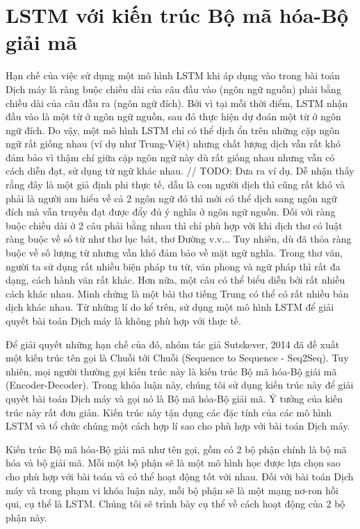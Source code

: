 \section{LSTM với kiến trúc Bộ mã hóa-Bộ giải mã}
Hạn chế của việc sử dụng một mô hình LSTM khi áp dụng vào trong bài toán Dịch máy là ràng buộc chiều dài của câu đầu vào (ngôn ngữ nguồn) phải bằng chiều dài của câu đầu ra (ngôn ngữ đích). Bởi vì tại mỗi thời điểm, LSTM nhận đầu vào là một từ ở ngôn ngữ nguồn, sau đó thực hiện dự đoán một từ ở ngôn ngữ đích. Do vậy, một mô hình LSTM chỉ có thể dịch ổn trên những cặp ngôn ngữ rất giống nhau (ví dụ như Trung-Việt) nhưng chất lượng dịch vẫn rất khó đảm bảo vì thậm chí giữa cặp ngôn ngữ này dù rất giống nhau nhưng vẫn có cách diễn đạt, sử dụng từ ngữ khác nhau. // TODO: Đưa ra ví dụ. Dễ nhận thấy rằng đây là một giả định phi thực tế, dẫu là con người dịch thì cũng rất khó và phải là người am hiểu về cả 2 ngôn ngữ đó thì mới có thể dịch sang ngôn ngữ đích mà vẫn truyền đạt được đẩy đủ ý nghĩa ở ngôn ngữ nguồn. Đối với ràng buộc chiều dài ở 2 câu phải bằng nhau thì chỉ phù hợp với khi dịch thơ có luật ràng buộc về số từ như thơ lục bát, thơ Đường v.v... Tuy nhiên, dù đã thỏa ràng buộc về số lượng từ nhưng vẫn khó đảm bảo về mặt ngữ nghĩa. Trong thơ văn, người ta sử dụng rất nhiều biện pháp tu từ, văn phong và ngữ pháp thì rất đa dạng, cách hành văn rất khác. Hơn nữa, một câu có thể biểu diễn bởi rất nhiều cách khác nhau. Minh chứng là một bài thơ tiếng Trung có thể có rất nhiều bản dịch khác nhau. Từ những lí do kể trên, sử dụng một mô hình LSTM để giải quyết bài toán Dịch máy là không phù hợp với thực tế. 

Để giải quyết những hạn chế của đó, nhóm tác giả Sutskever, 2014 \cite{Seq2Seq2014} đã đề xuất một kiến trúc tên gọi là Chuỗi tới Chuỗi (Sequence to Sequence - Seq2Seq). Tuy nhiên, mọi người thường gọi kiến trúc này là kiến trúc Bộ mã hóa-Bộ giải mã (Encoder-Decoder). Trong khóa luận này, chúng tôi sử dụng kiến trúc này để giải quyết bài toán Dịch máy và gọi nó là Bộ mã hóa-Bộ giải mã. Ý tưởng của kiến trúc này rất đơn giản. Kiến trúc này tận dụng các đặc tính của các mô hình LSTM và tổ chức chúng một cách hợp lí sao cho phù hợp với bài toán Dịch máy. 

Kiến trúc Bộ mã hóa-Bộ giải mã như tên gọi, gồm có 2 bộ phận chính là bộ mã hóa và bộ giải mã. Mỗi một bộ phận sẽ là một mô hình học được lựa chọn sao cho phù hợp với bài toán và có thể hoạt động tốt với nhau. Đối với bài toán Dịch máy và trong phạm vi khóa luận này, mỗi bộ phận sẽ là một mạng nơ-ron hồi qui, cụ thể là LSTM. Chúng tôi sẽ trình bày cụ thể về cách hoạt động của 2 bộ phận này.

